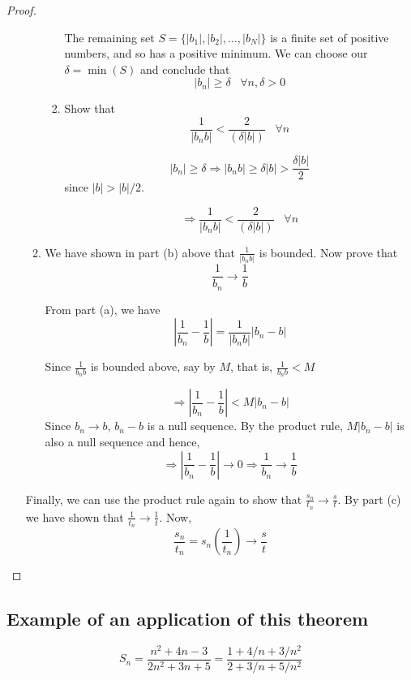 \documentclass[12pt]{scrbook}
\begin{document}
\begin{proof}
\begin{enumerate}
\begin{enumerate}
\begin{enumerate}
The remaining set $S = \{ |b_1|,  |b_2|,  \ldots, |b_N| \}$ is a finite set of positive numbers, and so has a positive minimum. 
We can choose our $\delta = \min(S)$ and conclude that
\[ |b_n| \ge \delta \;\;\; \forall n, \delta > 0 \]

\item Show that 
\[ \frac{1}{|b_n b|} < \frac{2}{(\delta |b|)} \;\;\; \forall n \]

\[ |b_n| \ge \delta \Rightarrow |b_n b| \ge \delta |b| > \frac{\delta |b|}{2} \]
since $|b| > |b|/2$.

\[ \Rightarrow \frac{1}{|b_n b|} < \frac{2}{(\delta |b|)} \;\;\; \forall n \]

\end{enumerate}

\item We have shown in part (b) above that $\frac{1}{|b_n b|}$ is bounded.  Now prove that 
\[ \frac{1}{b_n}\rightarrow \frac{1}{b} \]

From part (a), we have
\[\left| \frac{1}{b_n} - \frac{1}{b} \right| = \frac{1}{|b_n b|} \left| b_n - b \right| \]

Since $\frac{1}{b_n b}$ is bounded above, say by $M$, that is, $\frac{1}{b_n b} < M$

\[\Rightarrow \left| \frac{1}{b_n} -\frac{1}{b} \right| < M | b_n - b | \]
Since $b_n \rightarrow b$, $b_n - b$ is a null sequence.  By the product rule, $M|b_n - b|$ is also a null sequence and hence,
\[ \Rightarrow \left| \frac{1}{b_n} - \frac{1}{b} \right| \rightarrow 0 \Rightarrow  \frac{1}{b_n}\rightarrow \frac{1}{b} \]

\end{enumerate}

Finally, we can use the product rule again to show that $\frac{s_n}{t_n} \rightarrow \frac{s}{t} $.  By part (c) we have shown that 
$\frac{1}{t_n} \rightarrow \frac{1}{t}$.  Now,
\[ \frac{s_n}{t_n}  = s_n \left( \frac{1}{t_n} \right) \rightarrow \frac{s}{t} \] 

\end{enumerate}
\end{proof}

\subsection{Example of an application of this theorem}

\[ S_n = \frac{n^2 + 4n - 3}{2n^2 + 3n + 5} = \frac{1 + 4/n + 3/n^2}{2 + 3/n + 5/n^2} \]
\end{document}
